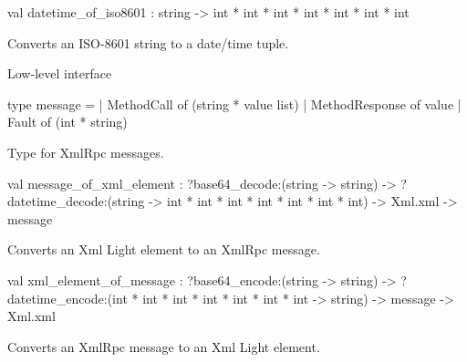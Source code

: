 \documentclass[11pt]{article}
\begin{document}
\label{val:XmlRpc.datetime-underscoreof-underscoreiso8601}\begin{ocamldoccode}
val datetime_of_iso8601 : string -> int * int * int * int * int * int * int
\end{ocamldoccode}
\begin{ocamldocdescription}
Converts an ISO-8601 string to a date/time tuple.


\end{ocamldocdescription}




Low-level interface



\label{type:XmlRpc.message}\begin{ocamldoccode}
type message =
  | MethodCall of (string * value list)
  | MethodResponse of value
  | Fault of (int * string)
\end{ocamldoccode}
\begin{ocamldocdescription}
Type for XmlRpc messages.


\end{ocamldocdescription}




\label{val:XmlRpc.message-underscoreof-underscorexml-underscoreelement}\begin{ocamldoccode}
val message_of_xml_element :
  ?base64_decode:(string -> string) ->
  ?datetime_decode:(string -> int * int * int * int * int * int * int) ->
  Xml.xml -> message
\end{ocamldoccode}
\begin{ocamldocdescription}
Converts an Xml Light element to an XmlRpc message.


\end{ocamldocdescription}




\label{val:XmlRpc.xml-underscoreelement-underscoreof-underscoremessage}\begin{ocamldoccode}
val xml_element_of_message :
  ?base64_encode:(string -> string) ->
  ?datetime_encode:(int * int * int * int * int * int * int -> string) ->
  message -> Xml.xml
\end{ocamldoccode}
\begin{ocamldocdescription}
Converts an XmlRpc message to an Xml Light element.


\end{ocamldocdescription}
\end{document}
